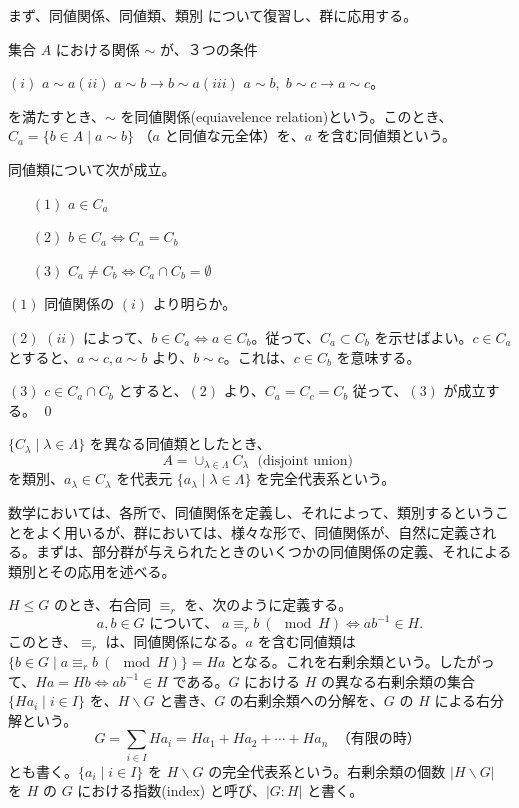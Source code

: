 \newpage
{}
まず、同値関係、同値類、類別 について復習し、群に応用する。

\begin{definition}
集合 $A$ における関係 $\sim$ が、３つの条件

\smallskip
$(i)$ $a\sim a$\quad $(ii)$ $a\sim b \to b\sim a$\quad $(iii)$ $a\sim b, \;b\sim c\to a\sim c$。

\smallskip\noindent
を満たすとき、$\sim$ を同値関係(equiavelence relation)という。このとき、
$C_a = \{b\in A\mid a\sim b\}$ （$a$ と同値な元全体）を、$a$  を含む同値類という。
\end{definition}

\begin{lemma}
同値類について次が成立。
\begin{itemize}
\item[$(1)$] $a\in C_a$
\item[$(2)$] $b\in C_a \Leftrightarrow C_a = C_b$
\item[$(3)$] $C_a\neq C_b \Leftrightarrow C_a \cap C_b = \emptyset$
\end{itemize}
\end{lemma}
\proof
$(1)$ 同値関係の $(i)$ より明らか。

$(2)$ $(ii)$ によって、$b\in C_a \Leftrightarrow a\in C_b$。従って、$C_a\subset C_b$ を示せばよい。$c\in C_a$ とすると、$a\sim c, a\sim b$ より、$b\sim c$。これは、$c\in C_b$ を意味する。

$(3)$ $c\in C_a\cap C_b$ とすると、$(2)$ より、$C_a = C_c = C_b$ 従って、$(3)$ が成立する。
\qed

\medskip
$\{C_\lambda\mid \lambda\in \Lambda\}$ を異なる同値類としたとき、
$$A = \cup_{\lambda\in \Lambda} C_{\lambda}\; \mbox{ (disjoint union) }$$
を類別、$a_\lambda\in C_\lambda$ を代表元 $\{a_\lambda\mid \lambda\in \Lambda\}$ を完全代表系という。

\smallskip
数学においては、各所で、同値関係を定義し、それによって、類別するということをよく用いるが、群においては、様々な形で、同値関係が、自然に定義される。まずは、部分群が与えられたときのいくつかの同値関係の定義、それによる類別とその応用を述べる。

\medskip
$H\leq G$ のとき、右合同 $\equiv_r$ を、次のように定義する。
$$a, b\in G \mbox{ について、}\;a\equiv_r b\:(\mod H) \Leftrightarrow ab^{-1}\in H.$$
このとき、$\equiv_r$ は、同値関係になる。$a$ を含む同値類は $\{b\in G\mid a\equiv_r  b\:(\mod H)\} = Ha$  となる。これを右剰余類という。したがって、$Ha = Hb \Leftrightarrow ab^{-1}\in H$ である。$G$ における $H$ の異なる右剰余類の集合 $\{Ha_i\mid i\in I\}$ を、$H\backslash G$ と書き、$G$ の右剰余類への分解を、$G$ の $H$ による右分解という。
$$G = \sum_{i\in I}Ha_i = Ha_1 + Ha_2 + \cdots + Ha_n \;\mbox{ （有限の時） }$$
とも書く。$\{a_i \mid i\in I\}$ を $H\backslash G$ の完全代表系という。右剰余類の個数 $|H\backslash G|$ を $H$ の $G$ における指数(index) と呼び、$|G:H|$ と書く。

